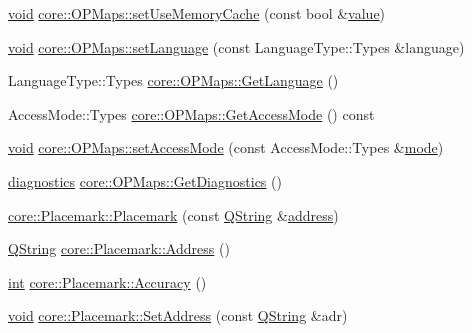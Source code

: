 \begin{DoxyCompactItemize}
\item 
\hyperlink{group___u_a_v_objects_plugin_ga444cf2ff3f0ecbe028adce838d373f5c}{void} \hyperlink{group___o_p_map_widget_ga87583d4fb36185a5b8275459e7703246}{core\-::\-O\-P\-Maps\-::set\-Use\-Memory\-Cache} (const bool \&\hyperlink{glext_8h_aa0e2e9cea7f208d28acda0480144beb0}{value})
\item 
\hyperlink{group___u_a_v_objects_plugin_ga444cf2ff3f0ecbe028adce838d373f5c}{void} \hyperlink{group___o_p_map_widget_gae64b24b63987a957d4365fcca6bab5e5}{core\-::\-O\-P\-Maps\-::set\-Language} (const Language\-Type\-::\-Types \&language)
\item 
Language\-Type\-::\-Types \hyperlink{group___o_p_map_widget_gaef0dbfe6f1a4d195b33a070779dffc33}{core\-::\-O\-P\-Maps\-::\-Get\-Language} ()
\item 
Access\-Mode\-::\-Types \hyperlink{group___o_p_map_widget_ga9903355f0dd5ff46a913e1a02bb059ea}{core\-::\-O\-P\-Maps\-::\-Get\-Access\-Mode} () const 
\item 
\hyperlink{group___u_a_v_objects_plugin_ga444cf2ff3f0ecbe028adce838d373f5c}{void} \hyperlink{group___o_p_map_widget_ga68cf9ffb0f3ff2362243777dbd773437}{core\-::\-O\-P\-Maps\-::set\-Access\-Mode} (const Access\-Mode\-::\-Types \&\hyperlink{glext_8h_a1e71d9c196e4683cc06c4b54d53f7ef5}{mode})
\item 
\hyperlink{structdiagnostics}{diagnostics} \hyperlink{group___o_p_map_widget_ga4e9750aee8233e707a09efdb60f4c1af}{core\-::\-O\-P\-Maps\-::\-Get\-Diagnostics} ()
\item 
\hyperlink{group___o_p_map_widget_gab9298de24074616417ed9c9eee1e3fcc}{core\-::\-Placemark\-::\-Placemark} (const \hyperlink{group___u_a_v_objects_plugin_gab9d252f49c333c94a72f97ce3105a32d}{Q\-String} \&\hyperlink{glext_8h_a86e3d190561a4ae1e195e1a2bcc83db5}{address})
\item 
\hyperlink{group___u_a_v_objects_plugin_gab9d252f49c333c94a72f97ce3105a32d}{Q\-String} \hyperlink{group___o_p_map_widget_ga6954c8bd25b9e37d34b49c03a88a33db}{core\-::\-Placemark\-::\-Address} ()
\item 
\hyperlink{ioapi_8h_a787fa3cf048117ba7123753c1e74fcd6}{int} \hyperlink{group___o_p_map_widget_ga35e7221f35ac45cd6b658ec7aaefe9f0}{core\-::\-Placemark\-::\-Accuracy} ()
\item 
\hyperlink{group___u_a_v_objects_plugin_ga444cf2ff3f0ecbe028adce838d373f5c}{void} \hyperlink{group___o_p_map_widget_gab54288ead0f6c2ce83424449ae9c0fe9}{core\-::\-Placemark\-::\-Set\-Address} (const \hyperlink{group___u_a_v_objects_plugin_gab9d252f49c333c94a72f97ce3105a32d}{Q\-String} \&adr)

\end{DoxyCompactItemize}
